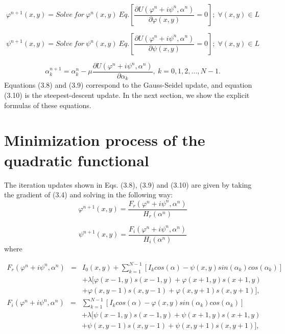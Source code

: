 \begin{equation}
\varphi^{n+1}(x,y)=Solve\: for\:\varphi^{n}(x,y)\: Eq.\left[\frac{\partial U(
\varphi^{n}+i\psi^{n},\alpha^{n})}{\partial\varphi(x,y)}=0\right];\;\forall(x,y)
\in L
\end{equation}


\begin{equation}
\psi^{n+1}(x,y)=Solve\: for\:\psi^{n}(x,y)\: Eq.\left[\frac{\partial U(\varphi^{
n}+i\psi^{n},\alpha^{n})}{\partial\psi(x,y)}=0\right];\;\forall(x,y)\in L
\end{equation}


\begin{equation}
\alpha_{k}^{n+1}=\alpha_{k}^{n}-\mu\frac{\partial U(\varphi^{n}+i\psi^{n},
\alpha^{n})}{\partial\alpha_{k}},\: k=0,1,2,...,N-1.
\end{equation}
Equations (3.8) and (3.9) correspond to the Gauss-Seidel update, and equation
(3.10) is the steepest-descent update. In the next section, we show the explicit 
formulas of these equations.

\section{Minimization process of the quadratic functional}

The iteration updates shown in Eqs. (3.8), (3.9) and (3.10) are given by
taking the gradient of (3.4) and solving in the following way:
\begin{equation}
\varphi^{n+1}(x,y)=\frac{F_{r}(\varphi^{n}+i\psi^{n},\alpha^{n})}{H_{r}(\alpha^{
n})}
\end{equation}


\begin{equation}
\psi^{n+1}(x,y)=\frac{F_{i}(\varphi^{n}+i\psi^{n},\alpha^{n})}{H_{i}(\alpha^{n})
}
\end{equation}
where

\begin{eqnarray}
F_{r}(\varphi^{n}+i\psi^{n},\alpha^{n}) & = & I_{0}(x,y)+\sum_{k=1}^{N-1}[I_{k}
cos(\alpha)-\psi(x,y)sin(\alpha_{k})cos(\alpha_{k})]\nonumber \\
 &  & +\lambda[\varphi(x-1,y)s(x-1,y)+\varphi(x+1,y)s(x+1,y)\\
 &  & +\varphi(x,y-1)s(x,y-1)+\varphi(x,y+1)s(x,y+1)],\nonumber 
\end{eqnarray}
\begin{eqnarray}
F_{i}(\varphi^{n}+i\psi^{n},\alpha^{n}) & = & \sum_{k=1}^{N-1}[I_{k}cos(\alpha)-
\varphi(x,y)sin(\alpha_{k})cos(\alpha_{k})]\nonumber \\
 &  & +\lambda[\psi(x-1,y)s(x-1,y)+\psi(x+1,y)s(x+1,y)\\
 &  & +\psi(x,y-1)s(x,y-1)+\psi(x,y+1)s(x,y+1)],\nonumber 
\end{eqnarray}


